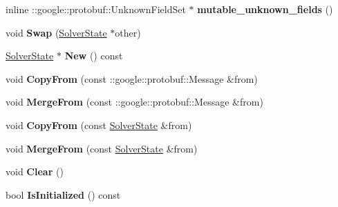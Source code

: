 \begin{DoxyCompactItemize}
\mbox{\label{classcaffe_1_1_solver_state_af86c44b9452ab75fce7bebd8f0a3df8b}} 
inline \+::google\+::protobuf\+::\+Unknown\+Field\+Set $\ast$ {\bfseries mutable\+\_\+unknown\+\_\+fields} ()
\item 
\mbox{\label{classcaffe_1_1_solver_state_a3e04c978054957dddc49143ec9a77f6f}} 
void {\bfseries Swap} (\mbox{\hyperlink{classcaffe_1_1_solver_state}{Solver\+State}} $\ast$other)
\item 
\mbox{\label{classcaffe_1_1_solver_state_ac7f56081bafa7093dabd1e963cc1a006}} 
\mbox{\hyperlink{classcaffe_1_1_solver_state}{Solver\+State}} $\ast$ {\bfseries New} () const
\item 
\mbox{\label{classcaffe_1_1_solver_state_a0c5b64fe3da4286ea521a755d472a6af}} 
void {\bfseries Copy\+From} (const \+::google\+::protobuf\+::\+Message \&from)
\item 
\mbox{\label{classcaffe_1_1_solver_state_aa7a4ab2581cc220b4efa07d5522877f2}} 
void {\bfseries Merge\+From} (const \+::google\+::protobuf\+::\+Message \&from)
\item 
\mbox{\label{classcaffe_1_1_solver_state_ab0a3c45b3ca8c44388b20078ab284199}} 
void {\bfseries Copy\+From} (const \mbox{\hyperlink{classcaffe_1_1_solver_state}{Solver\+State}} \&from)
\item 
\mbox{\label{classcaffe_1_1_solver_state_a32aa6c73d6bbe1a9cc9b7881d124fd81}} 
void {\bfseries Merge\+From} (const \mbox{\hyperlink{classcaffe_1_1_solver_state}{Solver\+State}} \&from)
\item 
\mbox{\label{classcaffe_1_1_solver_state_a51c98b3dfb7885cddcf7d462fe6777d1}} 
void {\bfseries Clear} ()
\item 
\mbox{\label{classcaffe_1_1_solver_state_a98ac82fd8ad73697208f93ea333baa92}} 
bool {\bfseries Is\+Initialized} () const
\item 
\mbox{\label{classcaffe_1_1_solver_state_a6e19b46e9505bf4cbf00846fdc463af8}} 

\end{DoxyCompactItemize}
